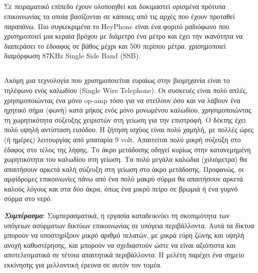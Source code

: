 \documentclass[12pt]{article}
\begin{document}
\begin{multicols}{2}
    \subsection{}
    Σε πειραματικό επίπεδο έχουν υλοποιηθεί και δοκιμαστεί ορισμένα πρότυπα επικοινωνίας τα οποία βασίζονται σε κάποιες από τις αρχές που έχουν προταθεί παραπάνω. Πιο συγκεκριμένα το HeyPhone είναι ένα φοριτό ραδιόφωνο που χρισημοποιεί μια κεραία βρόχου με διάμετρο ένα μέτρο και έχει την ικανότητα να διαπεράσει το έδοαφος σε βάθος μέχρι και 500 περίπου μέτρα, χρισημοποιεί διαμόρφωση 87KHz Single Side Band (SSB).
    \subsection{}
    Ακόμη μια τεχνολογία που χρισημοποιείται ευραίως στην βιομηχανία είναι το τηλέφωνο ενός καλωδίου (Single Wire Telephone). Οι συσκευές είναι πολύ απλές, χρησιμοποιώντας ένα μόνο op-amp τόσο για να στείλουν όσο και να λάβουν ένα ηχητικό σήμα (φωνή) κατά μήκος ενός μόνο μονωμένου καλωδίου, χρησιμοποιώντας τη χωρητικότητα σύζευξης χειριστών στη γείωση για την επιστροφή. Ο δέκτης έχει πολύ υψηλή αντίσταση εισόδου. Η ζήτηση ισχύος είναι πολύ χαμηλή, με πολλές ώρες (ή ημέρες) λειτουργίας από μπαταρία 9 volt. Απαιτείται πολύ μικρή σύζευξη στο έδαφος στο τέλος της λήψης. Το άκρο μετάδοσης οδηγεί κυρίως στην κατανεμημένη χωρητικότητα του καλωδίου στη γείωση. Τα πολύ μεγάλα καλώδια (χιλιόμετρα) θα απαιτήσουν αρκετά καλή σύζευξη στη γείωση στο άκρο μετάδοσης. Προφανώς, οι αμφίδρομες επικοινωνίες πάνω από ένα πολύ μακρύ σύρμα θα απαιτήσουν αρκετά καλούς λόγους και στα δύο άκρα, όπως ένα μικρό πείρο σε βρωμιά ή ένα γυμνό σύρμα στο νερό.

    \textit{\textbf{Συμπέρασμα}}: Συμπερασματικά, η εργασία καταδεικνύει τη σκοπιμότητα των υπόγειων ασύρματων δικτύων επικοινωνίας σε υπόγεια περιβάλλοντα. Αυτά τα δίκτυα μπορούν να υποστηρίξουν μικρό αριθμό πελατών, με μικρά εύρη ζώνης και υψηλή ανοχή καθυστέρησης, και μπορούν να σχεδιαστούν ώστε να είναι αξιόπιστα και αποτελεσματικά σε τέτοια απαιτητικά περιβάλλοντα. Η μελέτη παρέχει ένα σημείο εκκίνησης για μελλοντική έρευνα σε αυτόν τον τομέα.
\end{multicols}
\end{document}

